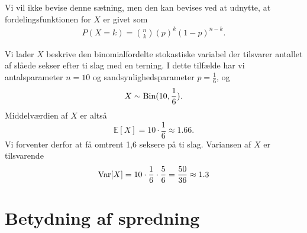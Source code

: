 Vi vil ikke bevise denne sætning, men den kan bevises ved at udnytte, at fordelingsfunktionen for $X$ er givet som
\begin{align*}
P(X = k) = \binom{n}{k}(p)^k(1-p)^{n-k}.
\end{align*}
\begin{exa}
Vi lader $X$ beskrive den binomialfordelte stokastiske variabel der tilsvarer antallet af slåede sekser efter ti slag med en terning. I dette tilfælde har vi antalsparameter $n = 10$ og sandsynlighedsparameter $p = \frac{1}{6}$, og 
\begin{align*}
X \sim \textnormal{Bin}(10,\frac{1}{6}). 
\end{align*}
Middelværdien af $X$ er altså
\[
\mathbb{E}[X] = 10\cdot \frac{1}{6} \approx 1.66.
\]
Vi forventer derfor at få omtrent 1,6 seksere på ti slag.
Variansen af $X$ er tilsvarende
\begin{align*}
\textnormal{Var}[X] = 10\cdot \frac{1}{6}\cdot \frac{5}{6} = \frac{50}{36} \approx 1.3
\end{align*}
\end{exa}

\section*{Betydning af spredning}


